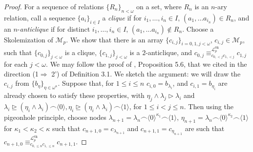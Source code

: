 \documentclass[12pt]{amsart}
\theoremstyle{definition}
\begin{document}
\begin{proof}
For a sequence of relations $\{R_{n}\}_{n < \omega}$ on a set, where $R_{n}$ is an $n$-ary relation, call a sequence $\{a_{i}\}_{i \in I}$ a \textit{clique} if for $i_{1}, \ldots, i_{n} \in I$, $(a_{1}, \ldots a_{i_{n}}) \in R_{n}$, and an $n$-\textit{anticlique} if for distinct $i_{1}, \ldots, i_{n} \in I$, $(a_{1}, \ldots a_{i_{n}}) \notin R_{n}$. Choose a Skolemization of $\mathcal{M}_{p}$. We show that there is an array $\{c_{i, j}\}_{i = 0, 1, j< \omega}$, $c_{i, j} \in \mathcal{M}_{p}$, such that $\{ c_{0, j}\}_{j < \omega}$ is a clique, $\{c_{1, j}\}_{j < \omega}$ is a $2$-anticlique, and $c_{0, j} \equiv^{\mathcal{L}^{\mathrm{Sk}}_{p}}_{c_{0, < j}c_{1, < j}} c_{1, j}$ for each $j < \omega$. We may follow the proof of \cite{CR15}, Proposition 5.6, that we cited in the direction (1$\Rightarrow$ 2') of Definition 3.1. We sketch the argument: we will draw the $c_{i,j}$ from $\{b_{\eta}\}_{\eta \in \omega^{\kappa}}$. Suppose that, for $1 \leq i \leq n$ $c_{i, 0}=b_{\lambda_{i}}$, and $c_{i, 1}=b_{\eta_{i}}$ are already chosen to satisfy these properties, with $\eta_{j} \wedge \lambda_{j} \rhd \lambda_{i}$ and $\lambda_{i} \unrhd  (\eta_{i} \wedge \lambda_{i})\smallfrown \langle 0 \rangle, \eta_{i} \unrhd  (\eta_{i} \wedge \lambda_{i})\smallfrown \langle 1 \rangle $, for $1 \leq i < j \leq n$. Then using the pigeonhole principle, choose nodes $\lambda_{n+1} =\lambda_{n}\smallfrown \langle 0 \rangle^{\kappa_{1}} \smallfrown \langle 1\rangle$, $\eta_{n+1} = \lambda_{n}\smallfrown \langle 0 \rangle^{\kappa_{2}} \smallfrown \langle 1\rangle$ for $\kappa_{1} < \kappa_{2} < \kappa$ such that $c_{n+1, 0}=c_{\lambda_{n+1}}$ and $c_{n+1, 1}=c_{\eta_{n+1}}$ are such that $c_{n+1, 0} \equiv^{\mathcal{L}^{\mathrm{Sk}}_{p}}_{c_{0, \leq n}c_{1, \leq n}} c_{n+1, 1}$.


\end{proof}
\end{document}
